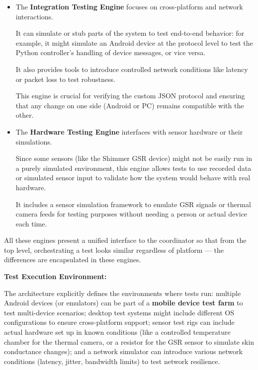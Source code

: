 {{\begin{itemize}
It provides a rich environment for testing the Python code with fixtures, mocks, and
even launching parts of the application in a headless mode.

For example, some tests might start the Python controller in a test mode to simulate
a recording session.

The Python engine also supports property-based testing and asynchronous testing (via
\texttt{pytest-asyncio}) to handle the asynchronous nature of networking and sensor
polling in the system.

\item The \textbf{Integration Testing Engine}
 focuses on cross-platform and network interactions.

It can simulate or stub parts of the system to test end-to-end behavior: for example,
it might simulate an Android device at the protocol level to test the Python
controller's handling of device messages, or vice versa.

It also provides tools to introduce controlled network conditions like latency or
packet loss to test robustness.

This engine is crucial for verifying the custom JSON protocol and ensuring that any
change on one side (Android or PC) remains compatible with the other.

\item The \textbf{Hardware Testing Engine}
 interfaces with sensor hardware or their simulations.

Since some sensors (like the Shimmer GSR device) might not be easily run in a purely
simulated environment, this engine allows tests to use recorded data or simulated
sensor input to validate how the system would behave with real hardware.

It includes a sensor simulation framework to emulate GSR signals or thermal camera
feeds for testing purposes without needing a person or actual device each time.

\end{itemize}

All these engines present a unified interface to the coordinator so that from the top
level, orchestrating a test looks similar regardless of platform --- the differences
are encapsulated in these engines.

\textbf{Test Execution Environment:}

The architecture explicitly defines the environments where tests run: multiple
Android devices (or emulators) can be part of a \textbf{mobile device test farm}
 to test multi-device scenarios; desktop test systems might include different OS
 configurations to ensure cross-platform support; sensor test rigs can include actual
 hardware set up in known conditions (like a controlled temperature chamber for the
 thermal camera, or a resistor for the GSR sensor to simulate skin conductance
 changes); and a network simulator can introduce various network conditions (latency,
 jitter, bandwidth limits) to test network resilience.

}}
